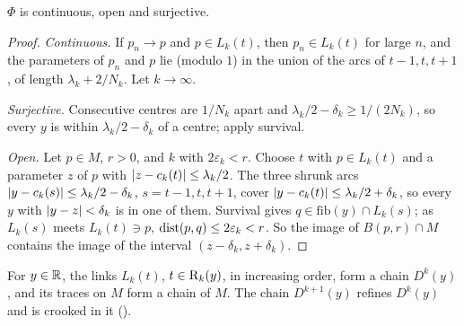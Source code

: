 
\begin{proposition}\label{prop:cd-map}
$\Phi$ is continuous, open and surjective.
\end{proposition}

\begin{proof}
\emph{Continuous.} If $p_n\to p$ and $p\in L_k(t)$, then $p_n\in L_k(t)$ for large $n$, and the parameters of $p_n$ and $p$ lie (modulo $1$) in the union of the arcs of $t-1,t,t+1$, of
length $\lambda_k+2/N_k$. Let $k\to\infty$.

\emph{Surjective.} Consecutive centres are $1/N_k$ apart and $\lambda_k/2-\delta_k\ge1/(2N_k)$, so every $y$ is within $\lambda_k/2-\delta_k$ of a centre; apply survival.

\emph{Open.} Let $p\in M$, $r>0$, and $k$ with $2\varepsilon_k<r$. Choose $t$ with $p\in L_k(t)$ and a parameter $z$ of $p$ with $\left\lvert z-c_k(t)\right\rvert\le\lambda_k/2$. The three shrunk arcs
$\left\lvert y-c_k(s)\right\rvert\le\lambda_k/2-\delta_k$, $s=t-1,t,t+1$, cover $\left\lvert y-c_k(t)\right\rvert\le\lambda_k/2+\delta_k$, so every $y$ with $\left\lvert y-z\right\rvert<\delta_k$ is in one of them. Survival gives $q\in\mathrm{fib}(y)\cap
L_k(s)$; as $L_k(s)$ meets $L_k(t)\ni p$, $\operatorname{dist}(p,q)\le2\varepsilon_k<r$. So the image of $B(p,r)\cap M$ contains the image of the interval $(z-\delta_k,z+\delta_k)$.
\end{proof}


\begin{lemma}\label{lem:cd-runs}
For $y\in\mathbb{R}$, the links $L_k(t)$, $t\in\operatorname{R}_k(y)$, in increasing order, form a chain $D^k(y)$, and its traces on $M$ form a chain of $M$. The chain $D^{k+1}(y)$ refines $D^k(y)$ and is crooked
in it ().
\end{lemma}

